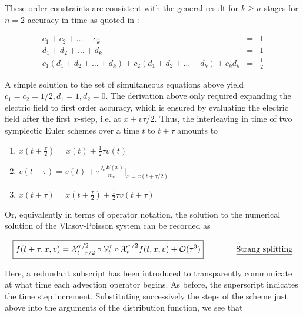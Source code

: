 \documentclass[11pt,titlepage]{report}
\begin{document}
\noindent These order constraints are consistent with the general result for $k \geq n$ stages for $n = 2$ accuracy in time as quoted in \cite[p.263]{Yoshida90}:

\begin{eqnarray*}
c_1 + c_2 + \ldots + c_k & = & 1 \\[0.3em]
d_1 + d_2 + \ldots + d_k & = & 1 \\[0.3em]
c_1(d_1 + d_2 + \ldots + d_k) + c_2(d_1 + d_2 + \ldots + d_k) + c_kd_k & = & \frac{1}{2}
\end{eqnarray*}

A simple solution to the set of simultaneous equations above yield $c_1 = c_2 = 1/2, d_1 = 1, d_2 = 0$. The derivation above only required expanding the electric field to first order accuracy, which is ensured by evaluating the electric field after the first $x$-step, i.e. at $x + v\tau / 2$. Thus, the interleaving in time of two symplectic Euler schemes over a time $t$ to $t + \tau$ amounts to


\begin{enumerate}
\item $x(t + \tfrac{\tau}{2})  = x(t) + \frac{1}{2}\tau v(t)$
\item $v(t + \tau )   =  v(t) + \tau\frac{q_{\alpha}E(x)}{m_{\alpha}}\biggr|_{x = x(t + \tau/2)}$
\item $x(t + \tau )  =  x(t + \tfrac{\tau}{2}) + \frac{1}{2}\tau v(t + \tau)$
\end{enumerate}




\noindent Or, equivalently in terms of operator notation, the solution to the numerical solution of the Vlasov-Poisson system can be recorded as

$$\boxed{f(t + \tau , x, v) = \mathcal{X}^{\tau /2}_{t + \tau /2}\circ\mathcal{V}^{\tau}_t\circ\mathcal{X}^{\tau / 2}_t f(t,x,v) + \mathcal{O}(\tau^3)} \qquad \qquad \textrm{\underline{Strang splitting}}$$

\noindent Here, a redundant subscript has been introduced to transparently communicate at what time each advection operator begins. As before, the superscript indicates the time step increment. Substituting successively the steps of the scheme just above into the arguments of the distribution function, we see that
\end{document}
